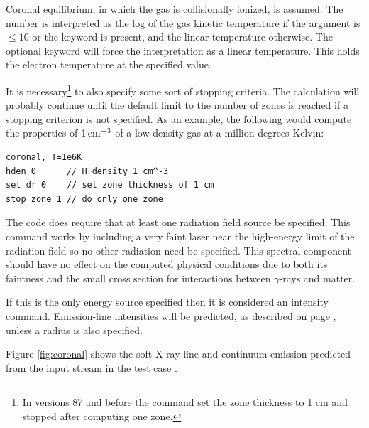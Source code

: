 Coronal equilibrium, in which the gas is collisionally ionized, is
assumed.
The number is interpreted as the log of the
gas kinetic temperature if the
argument is $\le 10$ or the keyword  is present, and the linear temperature otherwise.
The optional keyword
 will force the interpretation as a linear temperature.  This holds
the electron temperature at the specified value.

It is necessary\footnote{In versions 87 and before
the  command set the zone thickness
to 1 cm and stopped after computing one zone.}
to also specify some sort of stopping criteria.
The calculation will probably continue until the default
limit to the number
of zones is reached if a stopping criterion is not specified.
As an example, the following would compute the properties of $1 {\rm\thinspace cm^{-3}}$ of a
low density gas at a million degrees Kelvin:
\begin{verbatim}
coronal, T=1e6K
hden 0      // H density 1 cm^-3
set dr 0    // set zone thickness of 1 cm
stop zone 1 // do only one zone
\end{verbatim}

The code does require that at least one radiation field source be specified.
This command works by including a very faint laser
near the high-energy limit of the radiation field so no other radiation need be specified.
This spectral component should have no effect on the computed physical conditions
due to both its faintness and the small cross section for interactions between
$\gamma$-rays and matter.

If this is the only energy source specified then it is considered
an intensity command.
Emission-line intensities will be predicted,
as described on page \pageref{sec:IntensityLuminosityCases},
unless a radius is also specified.

Figure \ref{fig:coronal} shows the soft X-ray line and
continuum emission predicted
from the input stream in the test case .

